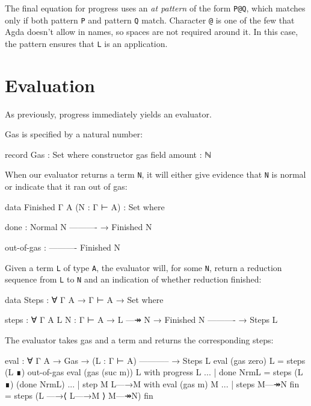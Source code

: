 The final equation for progress uses an \emph{at pattern} of the form
\texttt{P@Q}, which matches only if both pattern \texttt{P} and pattern
\texttt{Q} match. Character \texttt{@} is one of the few that Agda
doesn't allow in names, so spaces are not required around it. In this
case, the pattern ensures that \texttt{L} is an application.

\hypertarget{evaluation}{%
\section{Evaluation}\label{evaluation}}

As previously, progress immediately yields an evaluator.

Gas is specified by a natural number:

\begin{fence}
\begin{code}
record Gas : Set where
  constructor gas
  field
    amount : ℕ
\end{code}
\end{fence}

When our evaluator returns a term \texttt{N}, it will either give
evidence that \texttt{N} is normal or indicate that it ran out of gas:

\begin{fence}
\begin{code}
data Finished {Γ A} (N : Γ ⊢ A) : Set where

   done :
       Normal N
       ----------
     → Finished N

   out-of-gas :
       ----------
       Finished N
\end{code}
\end{fence}

Given a term \texttt{L} of type \texttt{A}, the evaluator will, for some
\texttt{N}, return a reduction sequence from \texttt{L} to \texttt{N}
and an indication of whether reduction finished:

\begin{fence}
\begin{code}
data Steps : ∀ {Γ A} → Γ ⊢ A → Set where

  steps : ∀ {Γ A} {L N : Γ ⊢ A}
    → L —↠ N
    → Finished N
      ----------
    → Steps L
\end{code}
\end{fence}

The evaluator takes gas and a term and returns the corresponding steps:

\begin{fence}
\begin{code}
eval : ∀ {Γ A}
  → Gas
  → (L : Γ ⊢ A)
    -----------
  → Steps L
eval (gas zero)    L                     =  steps (L ∎) out-of-gas
eval (gas (suc m)) L with progress L
... | done NrmL                          =  steps (L ∎) (done NrmL)
... | step {M} L—→M with eval (gas m) M
...    | steps M—↠N fin                  =  steps (L —→⟨ L—→M ⟩ M—↠N) fin
\end{code}
\end{fence}

